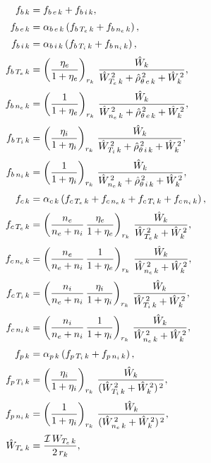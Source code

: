 \documentclass[notitlepage,12pt]{article}
\begin{document}
\begin{align}
f_{b\,k} &= f_{b\,e\,k}+f_{b\,i\,k},\\[0.5ex]
f_{b\,e\,k} &= \alpha_{b\,e\,k}\left(f_{b\,T_e\,k} + f_{b\,n_e\,k}\right),\\[0.5ex]
f_{b\,i\,k} &= \alpha_{b\,i\,k}\left(f_{b\,T_i\,k} + f_{b\,n_i\,k}\right),\\[0.5ex]
f_{b\,T_e\,k}&=\left(\frac{\eta_e}{1+\eta_e}\right)_{r_k}\,\frac{\hat{W}_k}{\hat{W}_{T_e\,k}^{\,2}+\hat{\rho}_{\theta\,e\,k}^{\,2}+\hat{W}_k^{\,2}},\\[0.5ex]
f_{b\,n_e\,k}&=\left(\frac{1}{1+\eta_e}\right)_{r_k}\,\frac{\hat{W}_k}{\hat{W}_{n_e\,k}^{\,2}+\hat{\rho}_{\theta\,e\,k}^{\,2}+\hat{W}_k^{\,2}},\\[0.5ex]
f_{b\,T_i\,k}&=\left(\frac{\eta_i}{1+\eta_i}\right)_{r_k}\,\frac{\hat{W}_k}{\hat{W}_{T_i\,k}^{\,2}+\hat{\rho}_{\theta\,i\,k}^{\,2}+\hat{W}_k^{\,2}},\\[0.5ex]
f_{b\,n_i\,k}&=\left(\frac{1}{1+\eta_i}\right)_{r_k}\,\frac{\hat{W}_k}{\hat{W}_{n_e\,k}^{\,2}+\hat{\rho}_{\theta\,i\,k}^{\,2}+\hat{W}_k^{\,2}},\\[0.5ex]
f_{c\,k} &= \alpha_{c\,k}\left(f_{c\,T_e\,k} + f_{c\,n_e\,k} + f_{c\,T_i\,k} + f_{c\,n_i\,k}\right),\\[0.5ex]
f_{c\,T_e\,k}&=\left(\frac{n_e}{n_e+n_i}\,\frac{\eta_e}{1+\eta_e}\right)_{r_k}\,\frac{\hat{W}_k}{\hat{W}_{T_e\,k}^{\,2}+\hat{W}_k^{\,2}},\\[0.5ex]
f_{c\,n_e\,k}&=\left(\frac{n_e}{n_e+n_i}\,\frac{1}{1+\eta_e}\right)_{r_k}\,\frac{\hat{W}_k}{\hat{W}_{n_e\,k}^{\,2}+\hat{W}_k^{\,2}},\\[0.5ex]
f_{c\,T_i\,k}&=\left(\frac{n_i}{n_e+n_i}\,\frac{\eta_i}{1+\eta_i}\right)_{r_k}\,\frac{\hat{W}_k}{\hat{W}_{T_i\,k}^{\,2}+\hat{W}_k^{\,2}},\\[0.5ex]
f_{c\,n_i\,k}&=\left(\frac{n_i}{n_e+n_i}\,\frac{1}{1+\eta_i}\right)_{r_k}\,\frac{\hat{W}_k}{\hat{W}_{n_e\,k}^{\,2}+\hat{W}_k^{\,2}},\\[0.5ex]
f_{p\,k} &= \alpha_{p\,k}\left(f_{p\,T_i\,k} + f_{p\,n_i\,k}\right),\\[0.5ex]
f_{p\,T_i\,k}&=\left(\frac{\eta_i}{1+\eta_i}\right)_{r_k}\,\frac{\hat{W}_k}{(\hat{W}_{T_i\,k}^{\,2}+\hat{W}_k^{\,2})^{\,2}},\\[0.5ex]
f_{p\,n_i\,k}&=\left(\frac{1}{1+\eta_i}\right)_{r_k}\,\frac{\hat{W}_k}{(\hat{W}_{n_e\,k}^{\,2}+\hat{W}_k^{\,2})^{\,2}},\\[0.5ex]
\hat{W}_{T_e\,k} &=\frac{{\cal I}\,W_{T_e\,k}}{2\,r_k} ,\\[0.5ex]

\end{align}
\end{document}
